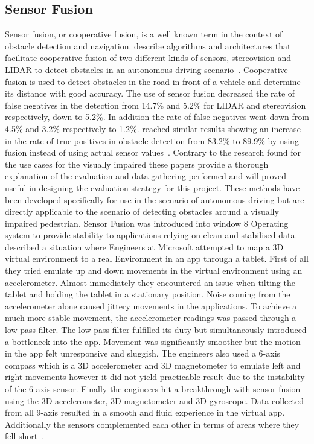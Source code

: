 \documentclass[prodmode,acmtosem]{acmsmall} %
\begin{document}
\subsection{Sensor Fusion}
Sensor fusion, or cooperative fusion, is a well known term in the context of obstacle detection and navigation. \citet{Labayrade2005} describe algorithms and architectures that facilitate cooperative fusion of two different kinds of sensors, stereovision and LIDAR to detect obstacles in an autonomous driving scenario~\cite{Labayrade2005}. Cooperative fusion is used to detect obstacles in the road in front of a vehicle and determine its distance with good accuracy. The use of sensor fusion decreased the rate of false negatives in the detection from 14.7\% and 5.2\% for LIDAR and stereovision respectively, down to 5.2\%. In addition the rate of false negatives went down from 4.5\% and 3.2\% respectively to 1.2\%. \citet{Cho2014} reached similar results showing an increase in the rate of true positives in obstacle detection from 83.2\% to 89.9\% by using fusion instead of using actual sensor values~\cite{Cho2014}. Contrary to the research found for the use cases for the visually impaired these papers provide a thorough explanation of the evaluation and data gathering performed and will proved useful in designing the evaluation strategy for this project. These methods have been developed specifically for use in the scenario of autonomous driving but are directly applicable to the scenario of detecting obstacles around a visually impaired pedestrian. Sensor Fusion was introduced into window 8 Operating system to provide stability to applications relying on clean and stabilised data. \citet{Gear2012} described a situation where Engineers at Microsoft attempted to map a 3D virtual environment to a real Environment in an app through a tablet. First of all they tried emulate up and down movements in the virtual environment using an accelerometer. Almost immediately they encountered an issue when tilting the tablet and holding the tablet in a stationary position. Noise coming from the accelerometer alone caused jittery movements in the applications. To achieve a much more stable movement, the accelerometer readings was passed through a low-pass filter. The low-pass filter fulfilled its duty but simultaneously introduced a bottleneck into the app. Movement was significantly smoother but the motion in the app felt unresponsive and sluggish. The engineers also used a 6-axis compass which is a 3D accelerometer and 3D magnetometer to emulate left and right movements however it did not yield practicable result due to the instability of the 6-axis sensor. Finally the engineers hit a breakthrough with sensor fusion using the 3D accelerometer, 3D magnetometer and 3D gyroscope. Data collected from all 9-axis resulted in a smooth and fluid experience in the virtual app. Additionally the sensors complemented each other in terms of areas where they fell short~\cite{Gear2012}.
\end{document}
